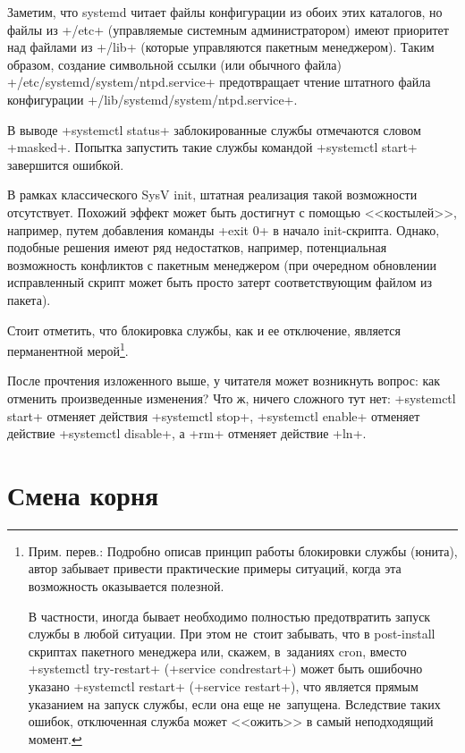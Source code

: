 \documentclass[10pt,oneside,a4paper]{article}
\begin{document}
\begin{itemize}
		Заметим, что systemd читает файлы конфигурации из обоих этих
		каталогов, но файлы из +/etc+ (управляемые системным
		администратором) имеют приоритет над файлами из +/lib+ (которые
		управляются пакетным менеджером). Таким образом, создание
		символьной ссылки (или обычного файла)
		+/etc/systemd/system/ntpd.service+ предотвращает чтение
		штатного файла конфигурации +/lib/systemd/system/ntpd.service+.

		В выводе +systemctl status+ заблокированные службы отмечаются
		словом +masked+. Попытка запустить такие службы командой
		+systemctl start+ завершится ошибкой.

		В рамках классического SysV init, штатная реализация такой
		возможности отсутствует. Похожий эффект может быть
		достигнут с помощью <<костылей>>, например, путем добавления
		команды +exit 0+ в начало init-скрипта. Однако, подобные решения
		имеют ряд недостатков, например, потенциальная возможность
		конфликтов с пакетным менеджером (при очередном обновлении
		исправленный скрипт может быть просто затерт соответствующим
		файлом из пакета).

		Стоит отметить, что блокировка службы, как и ее отключение,
		является перманентной мерой\footnote{Прим. перев.: Подробно
		описав принцип работы блокировки службы (юнита), автор забывает
		привести практические примеры ситуаций, когда эта возможность
		оказывается полезной.
		
		В частности, иногда бывает необходимо
		полностью предотвратить запуск службы в любой ситуации. При этом
		не~стоит забывать, что в post-install скриптах пакетного
		менеджера или, скажем, в~заданиях cron, вместо
		+systemctl try-restart+ (+service condrestart+) может быть
		ошибочно указано +systemctl restart+ (+service restart+), что
		является прямым указанием на запуск службы, если она еще
		не~запущена. Вследствие таких ошибок, отключенная служба может
		<<ожить>> в самый неподходящий момент.}.
\end{itemize}

После прочтения изложенного выше, у читателя может возникнуть вопрос: как
отменить произведенные изменения? Что ж, ничего сложного тут нет:
+systemctl start+ отменяет действия +systemctl stop+, +systemctl enable+
отменяет действие +systemctl disable+, а +rm+ отменяет действие
+ln+.

\section{Смена корня}
\label{sec:chroots}
\end{document}

